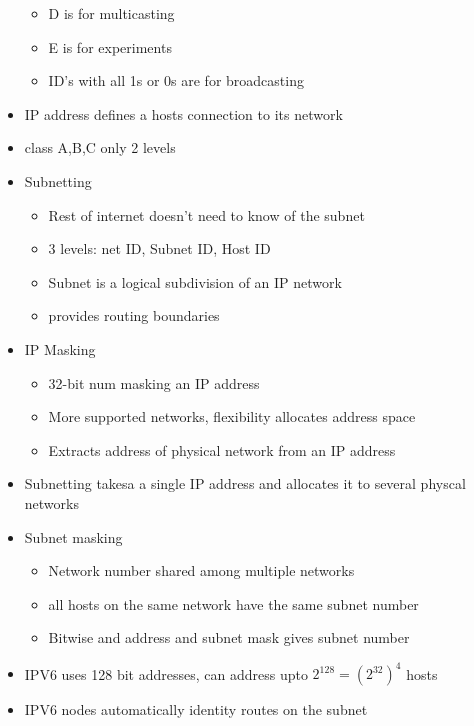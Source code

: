 \documentclass{article}
\begin{document}
\begin{itemize}
\begin{itemize}
            \item D is for multicasting
            \item E is for experiments
            \item ID's with all 1s or 0s are for broadcasting
        \end{itemize}
        \item IP address defines a hosts connection to its network
        \item class A,B,C only 2 levels
        \item Subnetting
        \begin{itemize}
            \item Rest of internet doesn't need to know of the subnet
            \item 3 levels: net ID, Subnet ID, Host ID
            \item Subnet is a logical subdivision of an IP network
            \item provides routing boundaries
        \end{itemize}
        \item IP Masking
        \begin{itemize}
            \item 32-bit num masking an IP address
            \item More supported networks, flexibility allocates address space
            \item Extracts address of physical network from an IP address
        \end{itemize}
        \item Subnetting takesa a single IP address and allocates it to several physcal networks
        \item Subnet masking
        \begin{itemize}
            \item Network number shared among multiple networks
            \item all hosts on the same network have the same subnet number
            \item Bitwise and address and subnet mask gives subnet number
        \end{itemize}
        \item IPV6 uses 128 bit addresses, can address upto $2^{128}=(2^{32})^4$ hosts
        \item IPV6 nodes automatically identity routes on the subnet
    \end{itemize}
\end{document}
